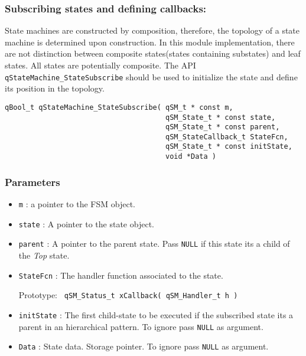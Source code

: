 \subsubsection{Subscribing states and defining callbacks: }
State  machines  are constructed by composition, therefore, the topology of a state machine is determined upon construction.
In this module implementation, there are not distinction between composite states(states containing substates) and leaf states. All states are potentially composite. 
The API \lstinline{qStateMachine_StateSubscribe} should be used to initialize the state and define its position in the topology.
\medskip

\begin{lstlisting}[style=CStyle]
qBool_t qStateMachine_StateSubscribe( qSM_t * const m, 
                                      qSM_State_t * const state, 
                                      qSM_State_t * const parent, 
                                      qSM_StateCallback_t StateFcn, 
                                      qSM_State_t * const initState, 
                                      void *Data )
\end{lstlisting}

\subsubsection*{Parameters}
\begin{itemize}
    \item \lstinline{m} : a pointer to the FSM object.
    \item \lstinline{state} :  A pointer to the state object.
    \item \lstinline{parent} : A pointer to the parent state. Pass \lstinline{NULL} if this state its a child of the \textit{Top} state.
    \item \lstinline{StateFcn} : The handler function associated to the state. 

                                 Prototype: \lstinline{ qSM_Status_t xCallback( qSM_Handler_t h ) }
    \item \lstinline{initState} : The first child-state to be executed if the subscribed state its a parent in an hierarchical pattern. To ignore pass \lstinline{NULL} as argument.
    \item \lstinline{Data} : State data. Storage pointer. To ignore pass \lstinline{NULL} as argument.
\end{itemize}  

